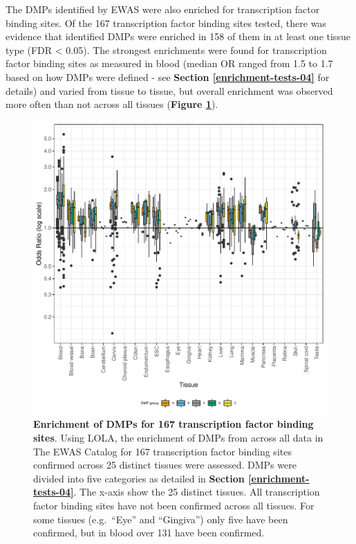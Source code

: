 \documentclass[11pt,oneside]{bristolthesis}
\begin{document}
The DMPs identified by EWAS were also enriched for transcription factor binding sites. Of the 167 transcription factor binding sites tested, there was evidence that identified DMPs were enriched in 158 of them in at least one tissue type (FDR \textless{} 0.05). The strongest enrichments were found for transcription factor binding sites as measured in blood (median OR ranged from 1.5 to 1.7 based on how DMPs were defined - see \textbf{Section \ref{enrichment-tests-04}} for details) and varied from tissue to tissue, but overall enrichment was observed more often than not across all tissues (\textbf{Figure \ref{fig:tfbs-plot}}).




\begin{figure}

{\centering \includegraphics[width=1\linewidth]{figure/04-properties_of_ewas/tfbs_enrichment_plot} 

}

\caption[Enrichment of DMPs for 167 transcription factor binding sites]{\textbf{Enrichment of DMPs for 167 transcription factor binding sites}. Using LOLA, the enrichment of DMPs from across all data in The EWAS Catalog for 167 transcription factor binding sites confirmed across 25 distinct tissues were assessed. DMPs were divided into five categories as detailed in \textbf{Section \ref{enrichment-tests-04}}. The x-axis show the 25 distinct tissues. All transcription factor binding sites have not been confirmed across all tissues. For some tissues (e.g.~``Eye'' and ``Gingiva'') only five have been confirmed, but in blood over 131 have been confirmed.}\label{fig:tfbs-plot}
\end{figure}
\newpage
\end{document}
